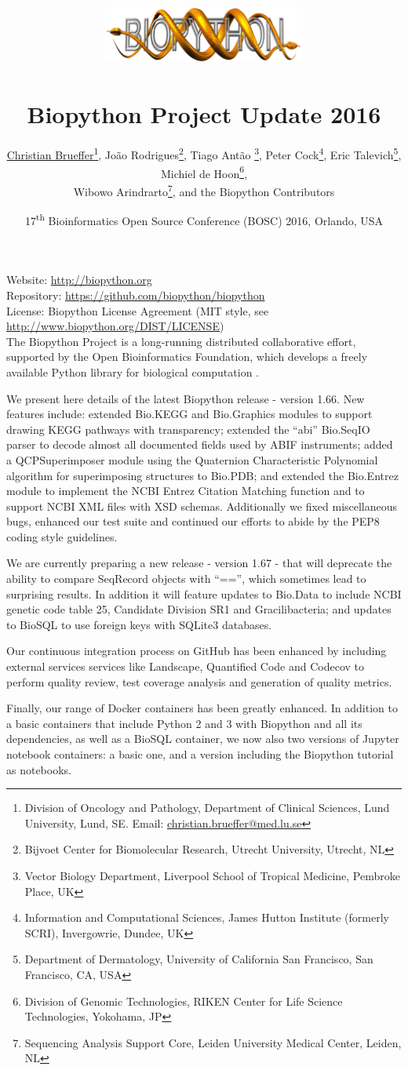 \documentclass[10pt,oneside]{article}
\title{%
\vspace{-1.5in}
\includegraphics[width=0.5\textwidth]{biopython.jpg}\\
~\\Biopython Project Update 2016}
\author{
	\underline{Christian Brueffer}\footnote{Division of Oncology and Pathology, Department of Clinical Sciences, Lund University, Lund, SE. Email: \href{mailto:christian.brueffer@med.lu.se}{christian.brueffer@med.lu.se}},
    Jo\~{a}o Rodrigues\footnote{Bijvoet Center for Biomolecular Research, Utrecht University, Utrecht, NL},
    Tiago Ant\~{a}o \footnote{Vector Biology Department, Liverpool School of Tropical Medicine, Pembroke Place, UK},
    Peter Cock\footnote{Information and Computational Sciences, James Hutton Institute (formerly SCRI), Invergowrie, Dundee, UK},
    Eric Talevich\footnote{Department of Dermatology, University of California San Francisco, San Francisco, CA, USA},
    Michiel de Hoon\footnote{Division of Genomic Technologies, RIKEN Center for Life Science Technologies, Yokohama, JP},
		\\
    Wibowo Arindrarto\footnote{Sequencing Analysis Support Core, Leiden University Medical Center, Leiden, NL},
    and the Biopython Contributors}
\date{17\textsuperscript{th} Bioinformatics Open Source Conference (BOSC) 2016, Orlando, USA}
\begin{document}
\maketitle
\thispagestyle{empty}

\vspace{-0.2in}
\noindent
Website: \url{http://biopython.org} \\
Repository: \url{https://github.com/biopython/biopython} \\
License: Biopython License Agreement (MIT style, see \url{http://www.biopython.org/DIST/LICENSE}) \\

The Biopython Project is a long-running distributed collaborative effort,
supported by the Open Bioinformatics Foundation, which develops a freely
available Python library for biological computation \cite{AppNote}.

We present here details of the latest Biopython release - version 1.66. New
features include: extended Bio.KEGG and Bio.Graphics modules to support drawing
KEGG pathways with transparency; extended the ``abi'' Bio.SeqIO parser to decode
almost all documented fields used by ABIF instruments; added a QCPSuperimposer
module using the Quaternion Characteristic Polynomial algorithm for superimposing
structures to Bio.PDB; and extended the Bio.Entrez module to implement the NCBI
Entrez Citation Matching function and to support NCBI XML files with XSD schemas.
Additionally we fixed miscellaneous bugs, enhanced our test suite and continued our
efforts to abide by the PEP8 coding style guidelines.

We are currently preparing a new release - version 1.67 - that will deprecate the
ability to compare SeqRecord objects with ``=='', which sometimes lead to surprising
results.  In addition it will feature updates to Bio.Data to include NCBI genetic
code table 25, Candidate Division SR1 and Gracilibacteria; and updates to BioSQL to
use foreign keys with SQLite3 databases.

Our continuous integration process on GitHub has been enhanced by including
external services services like Landscape, Quantified Code and Codecov to perform
quality review, test coverage analysis and generation of quality metrics.

Finally, our range of Docker containers has been greatly enhanced. In addition to
a basic containers that include Python 2 and 3 with Biopython and all its
dependencies, as well as a BioSQL container, we now also two versions of Jupyter
notebook containers: a basic one, and a version including the Biopython tutorial as
notebooks.
\end{document}
